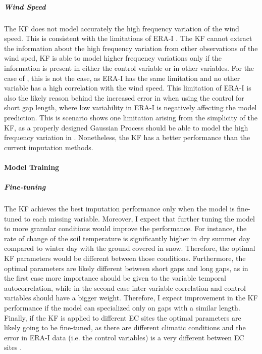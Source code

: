 \documentclass{article}
\begin{document}
\subparagraph{Wind Speed} The KF does not model accurately the high frequency variation of the wind speed. This is consistent with the limitations of ERA-I \cite{vuichard_filling_2015}. The KF cannot extract the information about the high frequency variation from other observations of the wind sped, KF is able to model higher frequency variations only if the information is present in either the control variable or in other variables. For the case of , this is not the case, as ERA-I has the same limitation and no other variable has a high correlation with the wind speed. This limitation of ERA-I is also the likely reason behind the increased error in  when using the control for short gap length, where low variability in ERA-I is negatively affecting the model prediction.
This is scenario shows one limitation arising from the simplicity of the KF, as a properly designed Gaussian Process should be able to model the high frequency variation in . Nonetheless, the KF has a better performance than the current imputation methods. 


\paragraph{Model Training}

\subparagraph{Fine-tuning} The KF achieves the best imputation performance only when the model is fine-tuned to each missing variable. 
Moreover, I expect that further tuning the model to more granular conditions would improve the performance.
For instance, the rate of change of the soil temperature is significantly  higher in dry summer day compared to winter day with the ground covered in snow. Therefore, the optimal KF parameters would be different between those conditions.
Furthermore, the optimal parameters are likely different between short gaps and long gaps, as in the first case more importance should be given to the variable temporal autocorrelation, while in the second case inter-variable correlation and control variables should have a bigger weight. Therefore, I expect improvement in the KF performance if the model can specialized only on gaps with a similar length.
Finally, if the KF is applied to different EC sites the optimal parameters are likely going to be fine-tuned, as there are different climatic conditions and the error in ERA-I data (i.e. the control variables) is a very different between EC sites \cite{vuichard_filling_2015}. 
\end{document}
